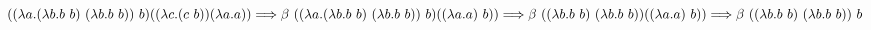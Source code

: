 \documentclass[12pt]{article}
\begin{document}
$((\lambda a.(\lambda b.b\ b)\ (\lambda b.b\ b))\ b)((\lambda c.(c\ b))(\lambda a.a)) 
\Longrightarrow \beta\ ((\lambda a.(\lambda b.b\ b)\ (\lambda b.b\ b))\ b)((\lambda a.a)\ b))\\
\Longrightarrow \beta\ ((\lambda b.b\ b)\ (\lambda b.b\ b))((\lambda a.a)\ b))
\Longrightarrow \beta\ ((\lambda b.b\ b)\ (\lambda b.b\ b))\ b
$
\end{document}
